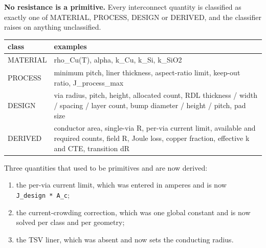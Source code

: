 \documentclass[10pt,]{article}
\providecommand{\tightlist}{%
  \setlength{\itemsep}{0pt}\setlength{\parskip}{0pt}}
\begin{document}
\textbf{No resistance is a primitive.} Every interconnect quantity is
classified as exactly one of MATERIAL, PROCESS, DESIGN or DERIVED, and
the classifier raises on anything unclassified.

\begin{longtable}[]{@{}ll@{}}
\toprule
\begin{minipage}[b]{0.47\columnwidth}\raggedright
class\strut
\end{minipage} & \begin{minipage}[b]{0.47\columnwidth}\raggedright
examples\strut
\end{minipage}\tabularnewline
\midrule
\endhead
\begin{minipage}[t]{0.47\columnwidth}\raggedright
MATERIAL\strut
\end{minipage} & \begin{minipage}[t]{0.47\columnwidth}\raggedright
rho\_Cu(T), alpha, k\_Cu, k\_Si, k\_SiO2\strut
\end{minipage}\tabularnewline
\begin{minipage}[t]{0.47\columnwidth}\raggedright
PROCESS\strut
\end{minipage} & \begin{minipage}[t]{0.47\columnwidth}\raggedright
minimum pitch, liner thickness, aspect-ratio limit, keep-out ratio,
J\_process\_max\strut
\end{minipage}\tabularnewline
\begin{minipage}[t]{0.47\columnwidth}\raggedright
DESIGN\strut
\end{minipage} & \begin{minipage}[t]{0.47\columnwidth}\raggedright
via radius, pitch, height, allocated count, RDL thickness / width /
spacing / layer count, bump diameter / height / pitch, pad size\strut
\end{minipage}\tabularnewline
\begin{minipage}[t]{0.47\columnwidth}\raggedright
DERIVED\strut
\end{minipage} & \begin{minipage}[t]{0.47\columnwidth}\raggedright
conductor area, single-via R, per-via current limit, available and
required counts, field R, Joule loss, copper fraction, effective k and
CTE, transition dR\strut
\end{minipage}\tabularnewline
\bottomrule
\end{longtable}

Three quantities that used to be primitives and are now derived:

\begin{enumerate}
\def\labelenumi{\arabic{enumi}.}
\tightlist
\item
  the per-via current limit, which was entered in amperes and is now
  \texttt{J\_design\ *\ A\_c};
\item
  the current-crowding correction, which was one global constant and is
  now solved per class and per geometry;
\item
  the TSV liner, which was absent and now sets the conducting radius.
\end{enumerate}
\end{document}
